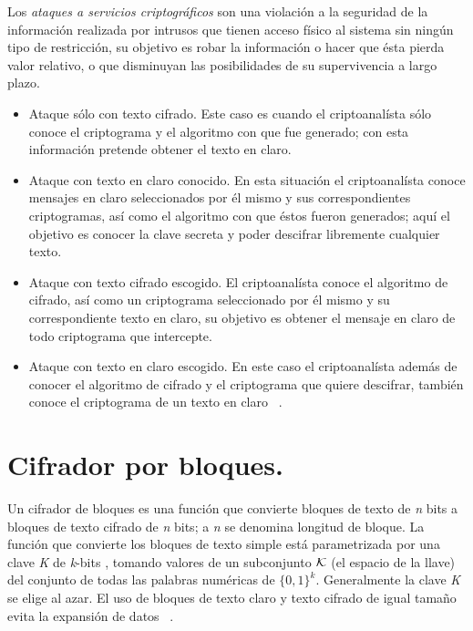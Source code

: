 Los \textit{ataques a servicios criptográficos } son una violación a la seguridad de la información realizada por intrusos que tienen acceso físico al sistema sin ningún tipo de restricción, su objetivo es robar la información o hacer que ésta pierda valor relativo, o que disminuyan las posibilidades de su supervivencia a largo plazo.\\
\begin{itemize}
\item Ataque sólo con texto cifrado. Este caso es cuando el criptoanalísta sólo conoce el criptograma y el algoritmo con que fue generado; con esta información pretende obtener el texto en claro.
\item Ataque con texto en claro conocido. En esta situación el criptoanalísta conoce mensajes en claro seleccionados por él mismo y sus correspondientes criptogramas, así como el algoritmo con que éstos fueron generados; aquí el objetivo es conocer la clave
secreta y poder descifrar libremente cualquier texto. 
\item Ataque con texto cifrado escogido. El criptoanalísta conoce el algoritmo de cifrado, así como un criptograma seleccionado por él mismo y su correspondiente texto en claro, su objetivo es obtener el mensaje en claro de todo criptograma que intercepte.
\item Ataque con texto en claro escogido. En este caso el criptoanalísta además de conocer el algoritmo de cifrado y el criptograma que quiere descifrar, también conoce el criptograma de un texto en claro ~\cite{ataques}.
\end{itemize} 

\section{Cifrador por bloques. }

Un cifrador de bloques es una función que convierte bloques de texto de \textit{n} bits a bloques de texto cifrado de \textit{n} bits; a \textit{n} se denomina longitud de bloque. La función que convierte los bloques de texto simple está parametrizada por una clave \textit{K} de \textit{ k}-bits , tomando valores de un subconjunto $\cal{K}$ (el espacio de la llave) del conjunto de todas las palabras numéricas de \textit{$ \{ 0,1 \} ^{k}$}. Generalmente la clave \textit{K} se elige al azar. El uso de bloques de texto claro y texto cifrado de igual tamaño evita la expansión de datos ~\cite{menezes}. \\

